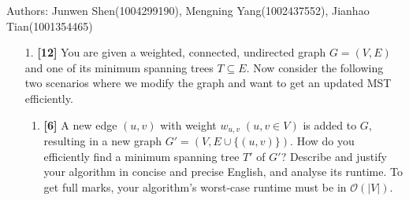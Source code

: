 \documentclass{assignment-263}
\begin{document}
\think
Authors: Junwen Shen(1004299190), Mengning Yang(1002437552), Jianhao Tian(1001354465)
\begin{enumerate}
	\item[1.] \textbf{[12]}
		You are given a weighted, connected, undirected graph $G=(V, E)$ and
		one of its minimum spanning trees $T\subseteq E$. Now consider the
		following two scenarios where we modify the graph and want to get an
		updated MST efficiently.
		\begin{enumerate}
			\item \textbf{[6]}
				A new edge $(u, v)$ with weight $w_{u, v}\;(u, v\in V)$ is
				added to $G$, resulting in a new graph $G'=(V, E\cup \{(u,
				v)\})$. How do you efficiently find a minimum spanning tree
				$T'$ of $G'$? Describe and justify your algorithm in concise
				and precise English, and analyse its runtime. To get full
				marks, your algorithm's worst-case runtime must be in
				$\mathcal{O}(|V|)$.


\end{enumerate}
\end{enumerate}
\end{document}
